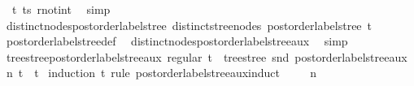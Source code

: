 \begin{isabellebody}
\ {}\ t{\isacharprime}{\kern0pt}\ ts{\isacharprime}{\kern0pt}\ r{\isacharunderscore}{\kern0pt}notin{\isacharunderscore}{\kern0pt}t{\isacharprime}{\kern0pt}\ \isamarkupfalse%
\ simp\isanewline
{}\isamarkupfalse%
%
\endisatagproof
{\isafoldproof}%
%
\isadelimproof
\isanewline
%
\endisadelimproof
\isanewline
{}\isamarkupfalse%
\ distinct{\isacharunderscore}{\kern0pt}nodes{\isacharunderscore}{\kern0pt}postorder{\isacharunderscore}{\kern0pt}label{\isacharunderscore}{\kern0pt}stree{\isacharcolon}{\kern0pt}\ {\isachardoublequoteopen}distinct{\isacharunderscore}{\kern0pt}stree{\isacharunderscore}{\kern0pt}nodes\ {\isacharparenleft}{\kern0pt}postorder{\isacharunderscore}{\kern0pt}label{\isacharunderscore}{\kern0pt}stree\ t{\isacharparenright}{\kern0pt}{\isachardoublequoteclose}\isanewline
%
\isadelimproof
\ \ %
\endisadelimproof
%
\isatagproof
{}\isamarkupfalse%
\ postorder{\isacharunderscore}{\kern0pt}label{\isacharunderscore}{\kern0pt}stree{\isacharunderscore}{\kern0pt}def\ \isamarkupfalse%
\ distinct{\isacharunderscore}{\kern0pt}nodes{\isacharunderscore}{\kern0pt}postorder{\isacharunderscore}{\kern0pt}label{\isacharunderscore}{\kern0pt}stree{\isacharunderscore}{\kern0pt}aux\ \isamarkupfalse%
\ simp%
\endisatagproof
{\isafoldproof}%
%
\isadelimproof
\isanewline
%
\endisadelimproof
\isanewline
{}\isamarkupfalse%
\ tree{\isacharunderscore}{\kern0pt}stree{\isacharunderscore}{\kern0pt}postorder{\isacharunderscore}{\kern0pt}label{\isacharunderscore}{\kern0pt}stree{\isacharunderscore}{\kern0pt}aux{\isacharcolon}{\kern0pt}\ {\isachardoublequoteopen}regular\ t\ {\isasymLongrightarrow}\ tree{\isacharunderscore}{\kern0pt}stree\ {\isacharparenleft}{\kern0pt}snd\ {\isacharparenleft}{\kern0pt}postorder{\isacharunderscore}{\kern0pt}label{\isacharunderscore}{\kern0pt}stree{\isacharunderscore}{\kern0pt}aux\ n\ t{\isacharparenright}{\kern0pt}{\isacharparenright}{\kern0pt}\ {\isacharequal}{\kern0pt}\ t{\isachardoublequoteclose}\isanewline
%
\isadelimproof
%
\endisadelimproof
%
\isatagproof
{}\isamarkupfalse%
\ {\isacharparenleft}{\kern0pt}induction\ t\ rule{\isacharcolon}{\kern0pt}\ postorder{\isacharunderscore}{\kern0pt}label{\isacharunderscore}{\kern0pt}stree{\isacharunderscore}{\kern0pt}aux{\isachardot}{\kern0pt}induct{\isacharparenright}{\kern0pt}\isanewline
\ \ \isamarkupfalse%
\ {\isacharparenleft}{\kern0pt}{}\ n{\isacharparenright}{\kern0pt}\isanewline
\ \ \isamarkupfalse%
\ \isamarkupfalse%

\end{isabellebody}

